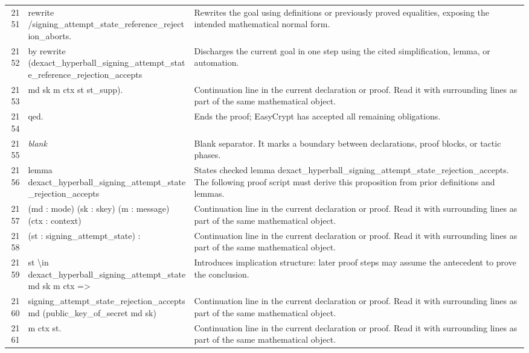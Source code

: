 \documentclass[10pt]{article}
\begin{document}
\begin{longtable}{r L{0.53\textwidth} L{0.37\textwidth}}
2151 & {\ttfamily\scriptsize rewrite /signing\_attempt\_state\_reference\_rejection\_aborts.} & Rewrites the goal using definitions or previously proved equalities, exposing the intended mathematical normal form. \\
2152 & {\ttfamily\scriptsize by rewrite (dexact\_hyperball\_signing\_attempt\_state\_reference\_rejection\_accepts} & Discharges the current goal in one step using the cited simplification, lemma, or automation. \\
2153 & {\ttfamily\scriptsize               md sk m ctx st st\_supp).} & Continuation line in the current declaration or proof.  Read it with surrounding lines as part of the same mathematical object. \\
2154 & {\ttfamily\scriptsize qed.} & Ends the proof; EasyCrypt has accepted all remaining obligations. \\
2155 & {\ttfamily\scriptsize \emph{blank}} & Blank separator.  It marks a boundary between declarations, proof blocks, or tactic phases. \\
2156 & {\ttfamily\scriptsize lemma dexact\_hyperball\_signing\_attempt\_state\_rejection\_accepts} & States checked lemma dexact\_hyperball\_signing\_attempt\_state\_rejection\_accepts.  The following proof script must derive this proposition from prior definitions and lemmas. \\
2157 & {\ttfamily\scriptsize    (md : mode) (sk : skey) (m : message) (ctx : context)} & Continuation line in the current declaration or proof.  Read it with surrounding lines as part of the same mathematical object. \\
2158 & {\ttfamily\scriptsize    (st : signing\_attempt\_state) :} & Continuation line in the current declaration or proof.  Read it with surrounding lines as part of the same mathematical object. \\
2159 & {\ttfamily\scriptsize   st \textbackslash{}in dexact\_hyperball\_signing\_attempt\_state md sk m ctx =>} & Introduces implication structure: later proof steps may assume the antecedent to prove the conclusion. \\
2160 & {\ttfamily\scriptsize   signing\_attempt\_state\_rejection\_accepts md (public\_key\_of\_secret md sk)} & Continuation line in the current declaration or proof.  Read it with surrounding lines as part of the same mathematical object. \\
2161 & {\ttfamily\scriptsize     m ctx st.} & Continuation line in the current declaration or proof.  Read it with surrounding lines as part of the same mathematical object. \\

\end{longtable}
\end{document}
